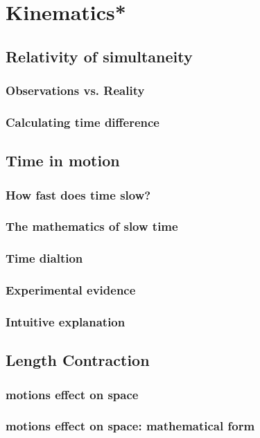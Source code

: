 
\section{Kinematics*}

\subsection{Relativity of simultaneity}
\subsubsection{Observations vs. Reality}
\subsubsection{Calculating time difference}

\subsection{Time in motion}
\subsubsection{How fast does time slow?}
\subsubsection{The mathematics of slow time}
\subsubsection{Time dialtion}
\subsubsection{Experimental evidence}
\subsubsection{Intuitive explanation}

\subsection{Length Contraction}
\subsubsection{motions effect on space}
\subsubsection{motions effect on space: mathematical form}
